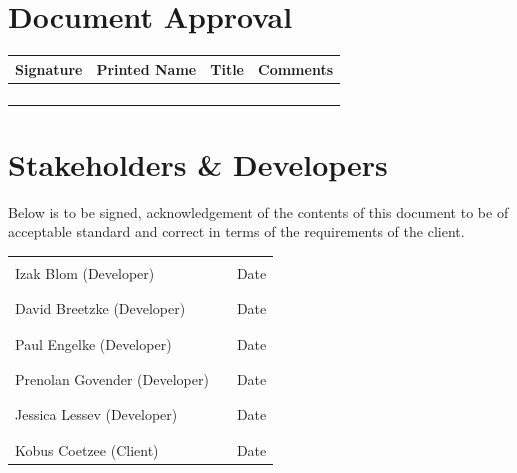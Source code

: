 \documentclass[11pt]{article}
\begin{document}
\section{Document Approval}
\begin{table}[h]
\begin{tabular}{llll}
\textbf{Signature}     & \textbf{Printed Name} & \textbf{Title}        & \textbf{Comments}     \\ \hline
\multicolumn{1}{|l|}{} & \multicolumn{1}{L{3.5cm}|}{} & \multicolumn{1}{L{3.5cm}|}{} & \multicolumn{1}{L{4cm}|}{} \\ \hline
\multicolumn{1}{|l|}{} & \multicolumn{1}{l|}{} & \multicolumn{1}{l|}{} & \multicolumn{1}{l|}{} \\ \hline
\multicolumn{1}{|l|}{} & \multicolumn{1}{l|}{} & \multicolumn{1}{l|}{} & \multicolumn{1}{l|}{} \\ \hline
\multicolumn{1}{|l|}{} & \multicolumn{1}{l|}{} & \multicolumn{1}{l|}{} & \multicolumn{1}{l|}{} \\ \hline
\end{tabular}
\end{table}

\newpage
\section{Stakeholders \& Developers}

Below is to be signed, acknowledgement of the contents of this document to be of acceptable standard and correct in terms of the requirements of the client.

\begin{table}[h]
\centering
\begin{tabular}{lll}
                              & \multicolumn{1}{L{3cm}}{} &    \multicolumn{1}{L{3cm}}{}    \\ \cline{1-1} \cline{3-3} 
Izak Blom (Developer)         &  & Date   \\
 & & \\
                              &  &        \\ \cline{1-1} \cline{3-3} 
David Breetzke (Developer)    &  & Date   \\
 & & \\
                              &  &        \\ \cline{1-1} \cline{3-3} 
Paul Engelke (Developer)      &  & Date   \\
 & & \\
                              &  &        \\ \cline{1-1} \cline{3-3} 
Prenolan Govender (Developer) &  & Date   \\
 & & \\
                              &  &        \\ \cline{1-1} \cline{3-3} 
Jessica Lessev (Developer)    &  & Date   \\
 & & \\
{\ul }                        &  & {\ul } \\ \cline{1-1} \cline{3-3} 
Kobus Coetzee (Client)        &  & Date  
\end{tabular}
\end{table}
\end{document}
